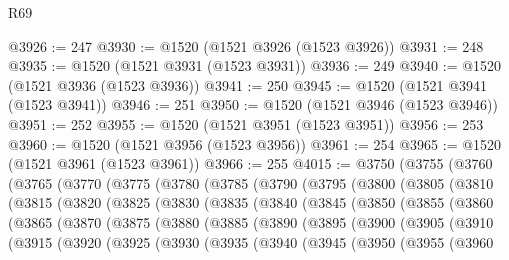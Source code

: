 \begin{lexlean}{R69}
\begin{coremodule}
{@3926 := 247
@3930 := @1520 (@1521 @3926 (@1523 @3926))
@3931 := 248
@3935 := @1520 (@1521 @3931 (@1523 @3931))
@3936 := 249
@3940 := @1520 (@1521 @3936 (@1523 @3936))
@3941 := 250
@3945 := @1520 (@1521 @3941 (@1523 @3941))
@3946 := 251
@3950 := @1520 (@1521 @3946 (@1523 @3946))
@3951 := 252
@3955 := @1520 (@1521 @3951 (@1523 @3951))
@3956 := 253
@3960 := @1520 (@1521 @3956 (@1523 @3956))
@3961 := 254
@3965 := @1520 (@1521 @3961 (@1523 @3961))
@3966 := 255
@4015 := @3750
    (@3755
      (@3760
        (@3765
          (@3770
            (@3775
              (@3780
                (@3785
                  (@3790
                    (@3795
                      (@3800
                        (@3805
                          (@3810
                            (@3815
                              (@3820
                                (@3825
                                  (@3830
                                    (@3835
                                      (@3840
                                        (@3845
                                          (@3850
                                            (@3855
                                              (@3860
                                                (@3865
                                                  (@3870
                                                    (@3875
                                                      (@3880
                                                        (@3885
                                                          (@3890
                                                            (@3895
                                                              (@3900
                                                                (@3905
                                                                  (@3910
                                                                    (@3915
                                                                      (@3920
                                                                        (@3925
                                                                          (@3930
                                                                            (@3935
                                                                              (@3940
                                                                                (@3945
                                                                                  (@3950
                                                                                    (@3955
                                                                                      (@3960
}
\end{coremodule}
\end{lexlean}
